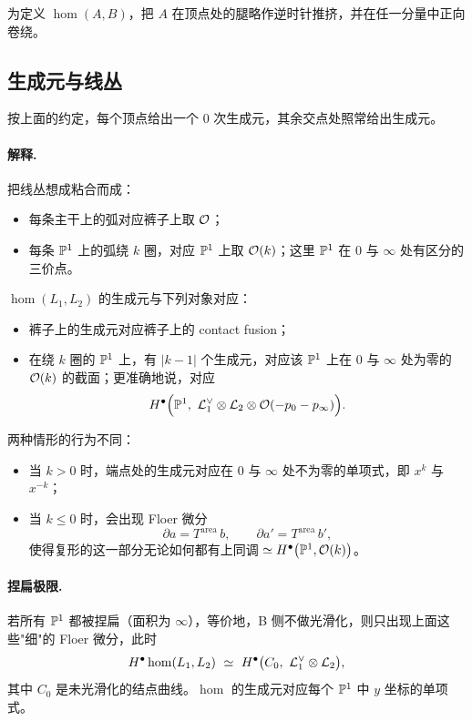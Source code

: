 为定义 $\hom(A,B)$，把 $A$ 在顶点处的腿略作逆时针推挤，并在任一分量中正向卷绕。

\subsection{生成元与线丛}

按上面的约定，每个顶点给出一个 $0$ 次生成元，其余交点处照常给出生成元。

\paragraph{解释.} 把线丛想成粘合而成：
\begin{itemize}
  \item 每条主干上的弧对应裤子上取 $\mathcal{O}$；
  \item 每条 $\mathbb{P}^1$ 上的弧绕 $k$ 圈，对应 $\mathbb{P}^1$ 上取 $\mathcal{O}(k)$；这里 $\mathbb{P}^1$ 在 $0$ 与 $\infty$ 处有区分的三价点。
\end{itemize}

$\hom(L_1,L_2)$ 的生成元与下列对象对应：
\begin{itemize}
  \item 裤子上的生成元对应裤子上的 contact fusion；
  \item 在绕 $k$ 圈的 $\mathbb{P}^1$ 上，有 $|k-1|$ 个生成元，对应该 $\mathbb{P}^1$ 上在 $0$ 与 $\infty$ 处为零的 $\mathcal{O}(k)$ 的截面；更准确地说，对应
  \[
  H^\bullet\Bigl(\PP^1,\ \LL_1^\vee\otimes\LL_2\otimes\OO(-p_0-p_\infty)\Bigr).
  \]
\end{itemize}

两种情形的行为不同：
\begin{itemize}
  \item 当 $k>0$ 时，端点处的生成元对应在 $0$ 与 $\infty$ 处不为零的单项式，即 $x^k$ 与 $x^{-k}$；
  \item 当 $k\le0$ 时，会出现 Floer 微分
  \[
  \partial a=T^{\mathrm{area}}\,b,\qquad \partial a'=T^{\mathrm{area}}\,b',
  \]
  使得复形的这一部分无论如何都有上同调 $\simeq H^\bullet\bigl(\mathbb{P}^1,\mathcal{O}(k)\bigr)$。
\end{itemize}

\paragraph{捏扁极限.} 若所有 $\mathbb{P}^1$ 都被捏扁（面积为 $\infty$），等价地，B 侧不做光滑化，则只出现上面这些"细"的 Floer 微分，此时
\[
H^\bullet\hom(L_1,L_2)\ \simeq\ H^\bullet\bigl(C_0,\ \LL_1^\vee\otimes\LL_2\bigr),
\]
其中 $C_0$ 是未光滑化的结点曲线。$\hom$ 的生成元对应每个 $\mathbb{P}^1$ 中 $y$ 坐标的单项式。

